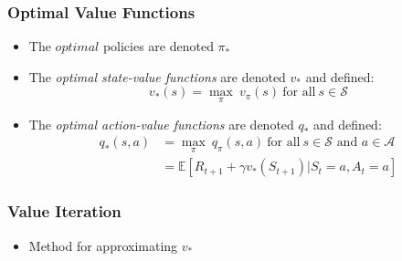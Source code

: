 \documentclass{beamer}
\begin{document}

\begin{frame}
\frametitle{Optimal Value Functions}
\begin{itemize}
\item The $optimal$ policies are denoted $\pi_{\ast}$
\item The \textit{optimal state-value functions} are denoted $v_{\ast}$ and defined:
\begin{equation}
v_{\ast}(s) = \underset{\pi}{\max} \ v_\pi(s) \ \textrm{for all} \ s \in \mathscr{S}
\nonumber
\end{equation}
\item The \textit{optimal action-value functions} are denoted $q_{\ast}$ and defined:
\begin{align*}
q_{\ast}(s,a) &= \underset{\pi}{\max} \ q_\pi(s,a) \ \textrm{for all} \ s \in \mathscr{S} \textrm{ and } a \in \mathscr{A} \\
&= \mathbb{E}[R_{t+1} + \gamma v_{\ast}(S_{t+1}) | S_t = a, A_t = a]
\nonumber
\end{align*}
\end{itemize}
\end{frame}



\begin{frame}
\frametitle{Value Iteration}
\begin{itemize}
\item Method for approximating $v_{\ast}$

\end{itemize}
\end{frame}




%
%

\end{document}
